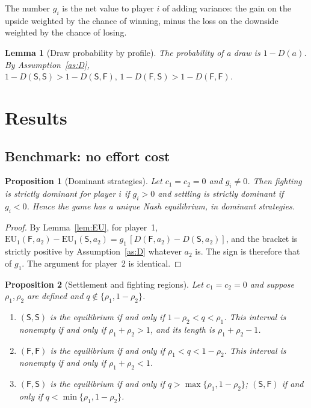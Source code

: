 \documentclass[11pt]{article}
\newtheorem{proposition}{Proposition}
\newtheorem{lemma}{Lemma}
\theoremstyle{definition}
\newcommand{\Sset}{\mathsf{S}}   %
\newcommand{\Fset}{\mathsf{F}}   %
\newcommand{\EU}{\mathrm{EU}}
\begin{document}
The number $g_i$ is the net value to player $i$ of adding variance: the gain
on the upside weighted by the chance of winning, minus the loss on the
downside weighted by the chance of losing.

\begin{lemma}[Draw probability by profile]\label{lem:draw}
The probability of a draw is $1-D(a)$. By Assumption~\ref{as:D},
$1-D(\Sset,\Sset)>1-D(\Sset,\Fset),\,1-D(\Fset,\Sset)>1-D(\Fset,\Fset)$.
\end{lemma}

\section{Results}

\subsection{Benchmark: no effort cost}

\begin{proposition}[Dominant strategies]\label{prop:dom}
Let $c_1=c_2=0$ and $g_i\neq 0$. Then fighting is strictly dominant for player
$i$ if $g_i>0$ and settling is strictly dominant if $g_i<0$. Hence the game has
a unique Nash equilibrium, in dominant strategies.
\end{proposition}

\begin{proof}
By Lemma~\ref{lem:EU}, for player~1,
$\EU_1(\Fset,a_2)-\EU_1(\Sset,a_2)=g_1\,[D(\Fset,a_2)-D(\Sset,a_2)]$, and
the bracket is strictly positive by Assumption~\ref{as:D} whatever $a_2$ is.
The sign is therefore that of $g_1$. The argument for player~2 is identical.
\end{proof}

\begin{proposition}[Settlement and fighting regions]\label{prop:regions}
Let $c_1=c_2=0$ and suppose $\rho_1,\rho_2$ are defined and $q\notin\{\rho_1,1-\rho_2\}$.
\begin{enumerate}
\item[(a)] $(\Sset,\Sset)$ is the equilibrium if and only if
$1-\rho_2<q<\rho_1$. This interval is nonempty if and only if
$\rho_1+\rho_2>1$, and its length is $\rho_1+\rho_2-1$.
\item[(b)] $(\Fset,\Fset)$ is the equilibrium if and only if
$\rho_1<q<1-\rho_2$. This interval is nonempty if and only if
$\rho_1+\rho_2<1$.
\item[(c)] $(\Fset,\Sset)$ is the equilibrium if and only if
$q>\max\{\rho_1,1-\rho_2\}$; $(\Sset,\Fset)$ if and only if
$q<\min\{\rho_1,1-\rho_2\}$.
\end{enumerate}
\end{proposition}
\end{document}
